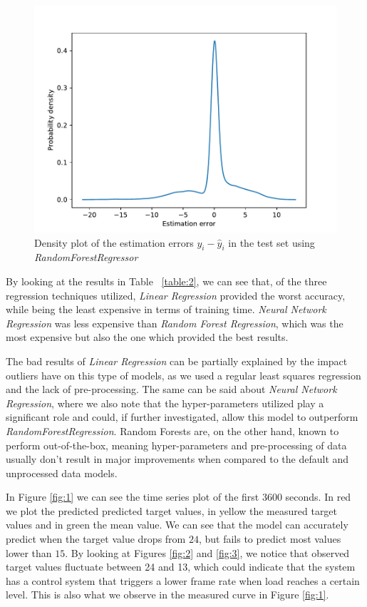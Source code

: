 \documentclass[10pt]{article}
\begin{document}
\begin{figure}
    \centering
    \includegraphics[width=\textwidth,height=0.25\textheight,keepaspectratio]{../result/project1/error_density.pdf}
    \caption{Density plot of the estimation errors $y_i - \hat{y}_i$ in the test set using \textit{RandomForestRegressor}}
    \label{fig:4}
\end{figure}

\clearpage

By looking at the results in Table ~\ref{table:2}, we can see that, of the three regression techniques utilized, \textit{Linear Regression} provided the worst accuracy, while being the least expensive in terms of training time. \textit{Neural Network Regression} was less expensive than \textit{Random Forest Regression}, which was the most expensive but also the one which provided the best results.

The bad results of \textit{Linear Regression} can be partially explained by the impact outliers have on this type of models, as we used a regular least squares regression and the lack of pre-processing. The same can be said about \textit{Neural Network Regression}, where we also note that the hyper-parameters utilized play a significant role and could, if further investigated, allow this model to outperform \textit{RandomForestRegression}. Random Forests are, on the other hand, known to perform out-of-the-box, meaning hyper-parameters and pre-processing of data usually don't result in major improvements when compared to the default and unprocessed data models.

In Figure \ref{fig:1} we can see the time series plot of the first 3600 seconds. In red we plot the predicted predicted target values, in yellow the measured target values and in green the mean value.
We can see that the model can accurately predict when the target value drops from $24$, but fails to predict most values lower than $15$. 
By looking at Figures \ref{fig:2} and \ref{fig:3}, we notice that observed target values fluctuate between 24 and 13, which could indicate that the system has a control system that triggers a lower frame rate when load reaches a certain level. This is also what we observe in the measured curve in Figure \ref{fig:1}.
\end{document}
